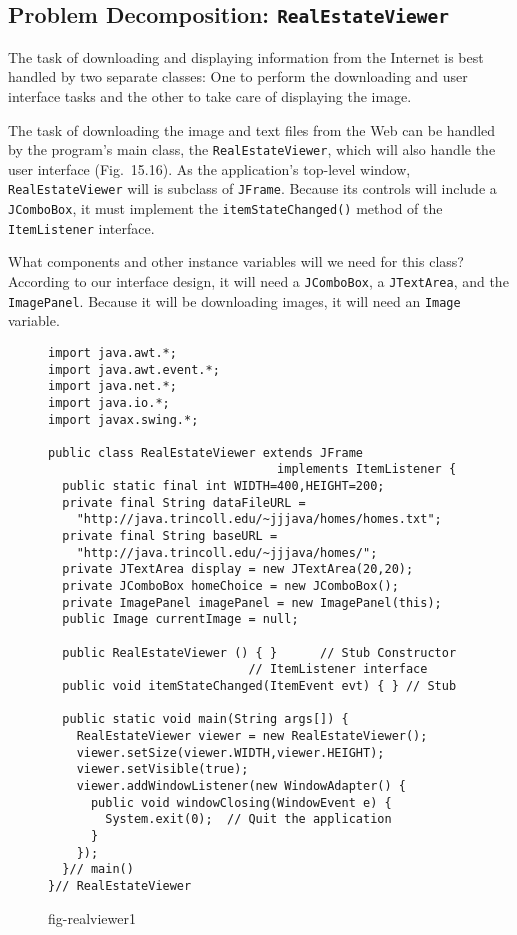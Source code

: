 {\subsection*{Problem Decomposition: {\tt RealEstateViewer}}
\noindent The task of downloading and displaying information from the Internet
is best handled by two separate classes: One to perform the
downloading and user interface tasks and the other to take care of
displaying the image.

The task of downloading the image and text files from the Web can be
handled by the program's main class, the {\tt RealEstateViewer}, which
will also handle the user interface (Fig.~15.16).  As the
application's top-level window, {\tt RealEstateViewer} will is
subclass of {\tt JFrame}.  Because its controls will include a {\tt
JComboBox}, it must implement the {\tt itemStateChanged()} method of
the {\tt ItemListener} interface.

What components and other instance variables will we need for this
class? According to our interface design, it will need a {\tt JComboBox},
a {\tt JTextArea}, and the {\tt ImagePanel}. Because it will be
downloading images, it will need an {\tt Image} variable.


\begin{figure}[tb]
\jjjprogstart
\begin{jjjlisting}
\begin{lstlisting}
import java.awt.*;
import java.awt.event.*;
import java.net.*;
import java.io.*;
import javax.swing.*;

public class RealEstateViewer extends JFrame 
                                implements ItemListener {
  public static final int WIDTH=400,HEIGHT=200;
  private final String dataFileURL =
    "http://java.trincoll.edu/~jjjava/homes/homes.txt";
  private final String baseURL = 
    "http://java.trincoll.edu/~jjjava/homes/";
  private JTextArea display = new JTextArea(20,20);
  private JComboBox homeChoice = new JComboBox();
  private ImagePanel imagePanel = new ImagePanel(this);
  public Image currentImage = null;

  public RealEstateViewer () { }      // Stub Constructor
                            // ItemListener interface
  public void itemStateChanged(ItemEvent evt) { } // Stub

  public static void main(String args[]) {
    RealEstateViewer viewer = new RealEstateViewer();
    viewer.setSize(viewer.WIDTH,viewer.HEIGHT);
    viewer.setVisible(true);
    viewer.addWindowListener(new WindowAdapter() {     
      public void windowClosing(WindowEvent e) {
        System.exit(0);  // Quit the application
      }
    });
  }// main()
}// RealEstateViewer
\end{lstlisting}
\end{jjjlisting}
{fig-realviewer1}
\end{figure}


}
